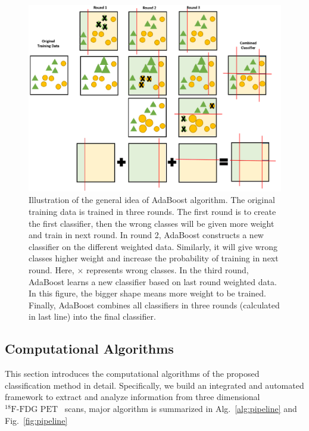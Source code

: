 \documentclass[authoryear,preprint,revi	ew,12pt]{elsarticle}
\newcommand{\FDGPET}   {$ ^{18}\textrm{F-FDG PET} $}
\begin{document}
\begin{centering}
	\begin{figure}
		\centering
		\includegraphics[width=\linewidth]{figures/adaboost.png}
		\caption[Illustration of the AdoBoost Algorithm.]{Illustration of the general idea of AdaBoost algorithm. The original training data is trained in three rounds. The first round is to create the first classifier, then the wrong classes will be given more weight and train in next round. In round 2, AdaBoost constructs a new classifier on the different weighted data. Similarly, it will give wrong classes higher weight and increase the probability of training in next round. Here, $ \times $ represents wrong classes. In the third round, AdaBoost learns a new classifier based on last round weighted data. In this figure, the bigger shape means more weight to be trained. Finally, AdaBoost combines all classifiers in three rounds (calculated in last line) into the final classifier.}
		\label{fig:adaboost}
	\end{figure}
\end{centering}

\subsection{Computational Algorithms}
\label{subsec:computational_algorithm}

This section introduces the computational algorithms of the proposed classification method in detail. Specifically, we build an integrated and automated framework to extract and analyze information from three dimensional \FDGPET~ scans, major algorithm is summarized in Alg.~\ref{alg:pipeline} and Fig.~\ref{fig:pipeline}
\end{document}
